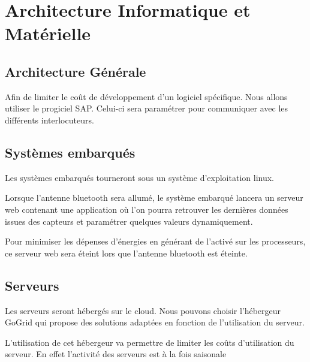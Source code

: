 \section{Architecture Informatique et Matérielle}

\subsection{Architecture Générale}
Afin de limiter le coût de développement d'un logiciel spécifique. Nous allons utiliser le progiciel SAP. Celui-ci sera paramétrer pour communiquer avec les différents interlocuteurs. 

\subsection{Systèmes embarqués}

Les systèmes embarqués tourneront sous un système d'exploitation linux. 

Lorsque l'antenne bluetooth sera allumé, le système embarqué lancera un serveur web
contenant une application où l'on pourra retrouver les dernières données issues
des capteurs et paramétrer quelques valeurs dynamiquement. 

Pour minimiser les dépenses d'énergies en générant de l'activé sur les processeurs, 
ce serveur web sera éteint lors que l'antenne bluetooth est éteinte. 


\subsection{Serveurs}

Les serveurs seront hébergés sur le cloud. Nous pouvons choisir l'hébergeur GoGrid 
qui propose des solutions adaptées en fonction de l'utilisation du serveur.

L'utilisation de cet hébergeur va permettre de limiter les coûts d'utilisation du serveur. 
En effet l'activité des serveurs est à la fois saisonale


